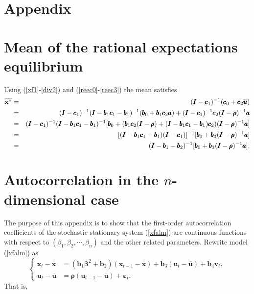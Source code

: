 \section*{Appendix}
\begin{appendix}

\section{Mean of the rational expectations equilibrium}
\label{appA}
Using (\ref{xf1}-\ref{div2}) and  (\ref{reec0}-\ref{reec3}) the mean satisfies
 \begin{eqnarray*}
 \overline{\bf x^*}&=&({\pmb I}-{\pmb c}_1)^{-1}(\pmb{c}_0+{\pmb c}_2\overline {\pmb u})\\
 &=&({\pmb I}-{\pmb c}_1)^{-1}({\pmb I}-{\pmb b}_1{\pmb c}_1-{\pmb b}_1)^{-1}({\pmb b}_0+{\pmb b}_1{\pmb c}_2{\pmb a})+({\pmb I}-{\pmb c}_1)^{-1}{\pmb c}_2({\pmb I}-{\pmb\rho})^{-1}{\pmb a}\\
 &=&({\pmb I}-{\pmb c}_1)^{-1}({\pmb I}-{\pmb b}_1{\pmb c}_1-{\pmb b}_1)^{-1}[{\pmb b}_0+({\pmb b}_1{\pmb c}_2({\pmb I}-{\pmb\rho})+({\pmb I}-{\pmb b}_1{\pmb c}_1-{\pmb b}_1){\pmb c}_2)({\pmb I}-{\pmb\rho})^{-1}{\pmb a}]\\
 &=&[({\pmb I}-{\pmb b}_1{\pmb c}_1-{\pmb b}_1)({\pmb I}-{\pmb c}_1)]^{-1}[{\pmb b}_0+{\pmb b}_3({\pmb I}-{\pmb\rho})^{-1}{\pmb a}]\\
  &=&({\pmb I}-{\pmb b}_1-{\pmb b}_2)^{-1}[{\pmb b}_0+{\pmb b}_3({\pmb I}-{\pmb\rho})^{-1}{\pmb a}].
\end{eqnarray*}


\section{Autocorrelation in the $n$-dimensional case}\label{ACFn}
The purpose of this appendix is to show that the first-order autocorrelation coefficients of the stochastic stationary system (\ref{xfalm}) are continuous functions with respect to $(\beta_1, \beta_2, \cdots,\beta_n)$ and the other related parameters. Rewrite model (\ref{xfalm}) as
\begin{equation}\label{modelmpn1}
    \left\{
    \begin{split}
            {\pmb x}_{t}-{\pmb{\overline x}}&=({\pmb b}_1 {\pmb\beta}^2+{\pmb b}_2)({\pmb x}_{t-1}-{\pmb{ \overline x}})+{\pmb b}_3({\pmb u}_t-{\pmb{ \overline u}})+{\pmb b}_4{\pmb v}_t,\\
            {\pmb u}_{t}-{\pmb {\overline u}}&={\pmb\rho} ({\pmb u}_{t-1}-{\pmb{\overline u}})+{\pmb\varepsilon}_t.
    \end{split}
    \right.
    \end{equation}
That is,


\end{appendix}
